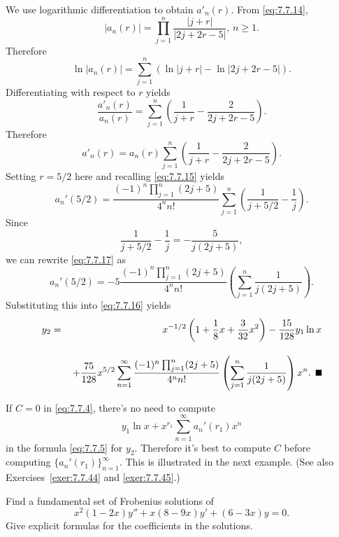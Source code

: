 \begin{examplesolution}
We use logarithmic differentiation to obtain $a'_{n}(r)$. From \eqref{eq:7.7.14},
\[
  |a_{n}(r)|=\prod_{j=1}^{n}\frac{|j+r|}{|2j+2r-5|},\,n\ge1.
\]
Therefore
\[
  \ln|a_{n}(r)|=\sum^{n}_{j=1}\left(\ln|j+r|-\ln|2j+2r-5|\right).
\]
Differentiating with respect to $r$ yields
\[
  \frac{a'_{n}(r)}{a_{n}(r)}=\sum^{n}_{j=1}\left(\frac{1}{j+r}-\frac{2}{2j+2r-5}\right).
\]
Therefore
\[
  a'_{n}(r)=a_{n}(r)\sum^{n}_{j=1}\left(\frac{1}{j+r}-\frac{2}{2j+2r-5}\right).
\]
Setting $r=5/2$ here and recalling \eqref{eq:7.7.15} yields
\begin{equation}
  \label{eq:7.7.17}a_{n}'(5/2)=\frac{(-1)^{n}\prod_{j=1}^{n}(2j+5)}{4^{n}n!}\sum_{j=1}^{n}\left(\frac{1}{j+5/2}-\frac{1}{j}\right).
\end{equation}
Since
\[
  \frac{1}{j+5/2}-\frac{1}{j}=-\frac{5}{j(2j+5)},
\]
we can rewrite \eqref{eq:7.7.17} as
\[
  a_{n}'(5/2)=-5{\frac{(-1)^{n}\prod_{j=1}^{n}(2j+5)}{4^{n}n!}}\left(\sum_{j=1}^{n}\frac{1}{j(2j+5)}\right).
\]
Substituting this into \eqref{eq:7.7.16} yields
\begin{eqnarray*}
  y_{2} & = & x^{-1/2}\left(1+\frac{1}{8}x+\frac{3}{32}x^{2}\right)-\frac{15}{128}y_{1}\ln x \\[10pt]
        &   & \,+\frac{75}{128}x^{5/2}\sum_{n=1}^{\infty}\frac{(-1)^{n}\prod_{j=1}^{n}(2j+5)}{4^{n}n!}\left(\sum_{j=1}^{n}\frac{1}{j(2j+5)}\right)x^{n}.\bbox
\end{eqnarray*}
\end{examplesolution}

If $C=0$ in \eqref{eq:7.7.4}, there's no need to compute
\[
  y_{1}\ln x+x^{r_{1}}\sum_{n=1}^{\infty}a_{n}'(r_{1})x^{n}
\]
in the formula \eqref{eq:7.7.5} for $y_{2}$. Therefore it's best to compute $C$ before computing
$\{a_{n}'(r_{1})\}_{n=1}^{\infty}$. This is illustrated in the next example. (See also
Exercises~\ref{exer:7.7.44} and \ref{exer:7.7.45}.)

\begin{example}
  \label{example:7.7.2} \rm Find a fundamental set of Frobenius solutions of
  \[
    x^{2}(1-2x)y''+x(8-9x)y'+(6-3x)y=0.
  \]
  Give explicit formulas for the coefficients in the solutions.
\end{example}

